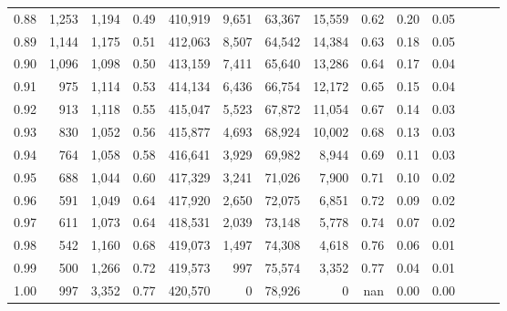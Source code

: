 \begin{tabular}{rrrrrrrrrrrrrr}
0.88 &   1,253 &  1,194 &  0.49 &  410,919 &    9,651 &  63,367 &  15,559 &  0.62 &  0.20 &      0.05 \\
0.89 &   1,144 &  1,175 &  0.51 &  412,063 &    8,507 &  64,542 &  14,384 &  0.63 &  0.18 &      0.05 \\
0.90 &   1,096 &  1,098 &  0.50 &  413,159 &    7,411 &  65,640 &  13,286 &  0.64 &  0.17 &      0.04 \\
0.91 &     975 &  1,114 &  0.53 &  414,134 &    6,436 &  66,754 &  12,172 &  0.65 &  0.15 &      0.04 \\
0.92 &     913 &  1,118 &  0.55 &  415,047 &    5,523 &  67,872 &  11,054 &  0.67 &  0.14 &      0.03 \\
0.93 &     830 &  1,052 &  0.56 &  415,877 &    4,693 &  68,924 &  10,002 &  0.68 &  0.13 &      0.03 \\
0.94 &     764 &  1,058 &  0.58 &  416,641 &    3,929 &  69,982 &   8,944 &  0.69 &  0.11 &      0.03 \\
0.95 &     688 &  1,044 &  0.60 &  417,329 &    3,241 &  71,026 &   7,900 &  0.71 &  0.10 &      0.02 \\
0.96 &     591 &  1,049 &  0.64 &  417,920 &    2,650 &  72,075 &   6,851 &  0.72 &  0.09 &      0.02 \\
0.97 &     611 &  1,073 &  0.64 &  418,531 &    2,039 &  73,148 &   5,778 &  0.74 &  0.07 &      0.02 \\
0.98 &     542 &  1,160 &  0.68 &  419,073 &    1,497 &  74,308 &   4,618 &  0.76 &  0.06 &      0.01 \\
0.99 &     500 &  1,266 &  0.72 &  419,573 &      997 &  75,574 &   3,352 &  0.77 &  0.04 &      0.01 \\
1.00 &     997 &  3,352 &  0.77 &  420,570 &        0 &  78,926 &       0 &   nan &  0.00 &      0.00 \\
\bottomrule
\end{tabular}
